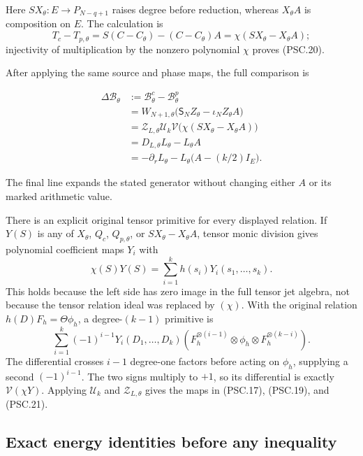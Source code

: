 Here \(SX_\theta:E\to P_{N-q+1}\) raises degree before reduction, whereas \(X_\theta A\) is composition on \(E\). The calculation is
\[
 T_c-T_{p,\theta}
 =S(C-C_\theta)-(C-C_\theta)A
 =\chi(SX_\theta-X_\theta A);
\]
injectivity of multiplication by the nonzero polynomial \(\chi\) proves (PSC.20).

After applying the same source and phase maps, the full comparison is

\[
 \boxed{
 \begin{aligned}
 \Delta\mathscr B_\theta
 &:=\mathscr B^c_\theta-\mathscr B^p_\theta\\
 &=W_{N+1,\theta}\bigl(\mathsf S_NZ_\theta-\iota_NZ_\theta A\bigr)\\
 &=\mathcal Z_{L,\theta}\mathcal U_k
   \mathcal V\bigl(\chi(SX_\theta-X_\theta A)\bigr)\\
 &=D_{L,\theta}L_\theta-L_\theta A\\
 &=-\partial_rL_\theta-L_\theta\bigl(A-(k/2)I_E\bigr).
 \end{aligned}}
 \tag{PSC.21}
\]

The final line expands the stated generator without changing either \(A\) or its marked arithmetic value.

There is an explicit original tensor primitive for every displayed relation. If \(Y(S)\) is any of \(X_\theta\), \(Q_c\), \(Q_{p,\theta}\), or \(SX_\theta-X_\theta A\), tensor monic division gives polynomial coefficient maps \(Y_i\) with
\[
 \chi(S)Y(S)=\sum_{i=1}^k h(s_i)Y_i(s_1,\ldots,s_k).
\]
This holds because the left side has zero image in the full tensor jet algebra, not because the tensor relation ideal was replaced by \((\chi)\). With the original relation
\(h(D)F_h=\Theta\phi_h\), a degree-\((k-1)\) primitive is
\[
 \sum_{i=1}^k(-1)^{i-1}Y_i(D_1,\ldots,D_k)
 \left(F_h^{\otimes(i-1)}\otimes\phi_h
       \otimes F_h^{\otimes(k-i)}\right).
 \tag{PSC.22}
\]
The differential crosses \(i-1\) degree-one factors before acting on \(\phi_h\), supplying a second \((-1)^{i-1}\). The two signs multiply to \(+1\), so its differential is exactly
\(\mathcal V(\chi Y)\). Applying \(\mathcal U_k\) and \(\mathcal Z_{L,\theta}\) gives the maps in (PSC.17), (PSC.19), and (PSC.21).

\subsection{Exact energy identities before any inequality}


